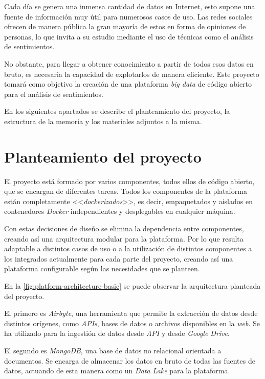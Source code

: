 
Cada día se genera una inmensa cantidad de datos en Internet, esto supone una fuente de información muy útil para numerosos casos de uso. Las redes sociales ofrecen de manera pública la gran mayoría de estos en forma de opiniones de personas, lo que invita a su estudio mediante el uso de técnicas como el análisis de sentimientos.

No obstante, para llegar a obtener conocimiento a partir de todos esos datos en bruto, es necesaria la capacidad de explotarlos de manera eficiente. Este proyecto tomará como objetivo la creación de una plataforma \textit{big data} de código abierto para el análisis de sentimientos. 

En los siguientes apartados se describe el planteamiento del proyecto, la estructura de la memoria y los materiales adjuntos a la misma.

\section{Planteamiento del proyecto}

El proyecto está formado por varios componentes, todos ellos de código abierto, que se encargan de diferentes tareas. Todos los componentes de la plataforma están completamente <<\textit{dockerizados}>>, es decir, empaquetados y aislados en contenedores \textit{Docker} independientes y desplegables en cualquier máquina.

Con estas decisiones de diseño se elimina la dependencia entre componentes, creando así una arquitectura modular para la plataforma. Por lo que resulta adaptable a distintos casos de uso o a la utilización de distintos componentes a los integrados actualmente para cada parte del proyecto, creando así una plataforma configurable según las necesidades que se planteen. 

En la \autoref{fig:platform-architecture-basic} se puede observar la arquitectura planteada del proyecto.


El primero es \textit{Airbyte}, una herramienta que permite la extracción de datos desde distintos orígenes, como \textit{APIs}, bases de datos o archivos disponibles en la \textit{web}. Se ha utilizado para la ingestión de datos desde \textit{API} y desde \textit{Google Drive}.

El segundo es \textit{MongoDB}, una base de datos no relacional orientada a documentos. Se encarga de almacenar los datos en bruto de todas las fuentes de datos, actuando de esta manera como un \textit{Data Lake} para la plataforma.

